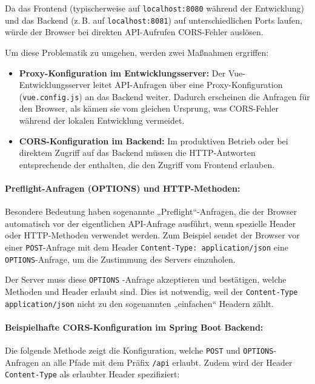 \documentclass[12pt, ngerman, a4paper, numbers=noenddot]{article}
\begin{document}
Da das Frontend (typischerweise auf \lstinline|localhost:8080| während der Entwicklung) und das Backend (z.\,B. auf \lstinline|localhost:8081|) auf unterschiedlichen Ports laufen, würde der Browser bei direkten API-Aufrufen CORS-Fehler auslösen.

Um diese Problematik zu umgehen, werden zwei Maßnahmen ergriffen:

\begin{itemize}
	\item \textbf{Proxy-Konfiguration im Entwicklungsserver:}  
	Der Vue\hyp{}Entwicklungsserver leitet API-Anfragen über eine Proxy-Konfiguration (\lstinline|vue.config.js|) an das Backend weiter. Dadurch erscheinen die Anfragen für den Browser, als kämen sie vom gleichen Ursprung, was CORS-Fehler während der lokalen Entwicklung vermeidet.
	
	\item \textbf{CORS-Konfiguration im Backend:}  
	Im produktiven Betrieb oder bei direktem Zugriff auf das Backend müssen die HTTP-Antworten entsprechende der enthalten, die den Zugriff vom Frontend erlauben.
\end{itemize}

\newpage
\paragraph{Preflight-Anfragen (OPTIONS) und HTTP-Methoden:}

Besondere Bedeutung haben sogenannte „Preflight“-Anfragen, die der Browser automatisch vor der eigentlichen API-Anfrage ausführt, wenn spezielle Header oder HTTP-Methoden verwendet werden. Zum Beispiel sendet der Browser vor einer \lstinline|POST|-Anfrage mit dem Header \lstinline|Content-Type: application/json| eine \lstinline|OPTIONS|-Anfrage, um die Zustimmung des Servers einzuholen. 

Der Server muss diese \lstinline|OPTIONS| -Anfrage akzeptieren und bestätigen, welche Methoden und Header erlaubt sind. Dies ist notwendig, weil der \lstinline|Content-Type| \lstinline|application/json| nicht zu den sogenannten „einfachen“ Headern zählt.

\paragraph{Beispielhafte CORS-Konfiguration im Spring Boot Backend:}

Die folgende Methode zeigt die Konfiguration, welche \lstinline|POST| und \lstinline|OPTIONS|-Anfragen an alle Pfade mit dem Präfix \lstinline|/api| erlaubt. Zudem wird der Header \lstinline|Content-Type| als erlaubter Header spezifiziert:
\end{document}
